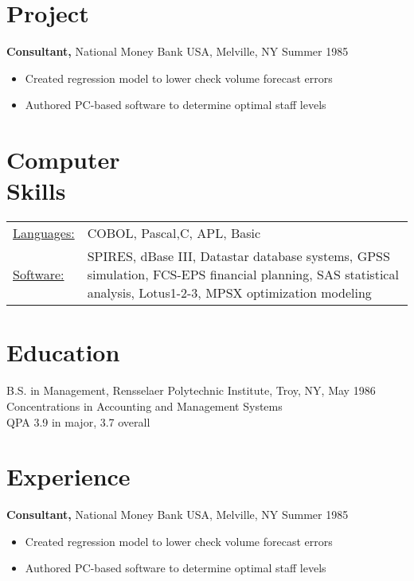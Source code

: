 \documentclass[margin]{res}
\begin{document}
 
 
 
\address{(518) 273-4617 }
\address{email@domaon.com\\
        GitHub/LinkedIn profile link }

 
\begin{resume} 
 
\section{Project}
 {\bf Consultant,} National Money Bank USA, Melville, NY \hfill Summer  1985
 \begin{itemize} \itemsep -2pt  %
 \item Created regression model to lower check volume 
                 forecast errors
 \item Authored PC-based software to determine optimal 
                 staff levels 
 \end{itemize}

 
\section{Computer \\ Skills}
   \begin{tabular}{l p{3in}}
    \underline{Languages:} & COBOL, Pascal,C, APL, Basic \\

     \underline{Software:} &  SPIRES, dBase III, Datastar database 
                        systems, GPSS simulation, FCS-EPS financial 
                        planning, SAS statistical analysis, 
                        Lotus1-2-3, MPSX optimization modeling 
 \end{tabular}

 
\section{Education} 
B.S. in Management, Rensselaer Polytechnic Institute, Troy, NY, May 1986 \\
Concentrations in Accounting and Management Systems \\
QPA 3.9 in major, 3.7 overall
 

\section{Experience}
 {\bf Consultant,} National Money Bank USA, Melville, NY \hfill Summer  1985
 \begin{itemize} \itemsep -2pt  %
 \item Created regression model to lower check volume 
                 forecast errors
 \item Authored PC-based software to determine optimal 
                 staff levels 
 \end{itemize}


\end{resume}
\end{document}
